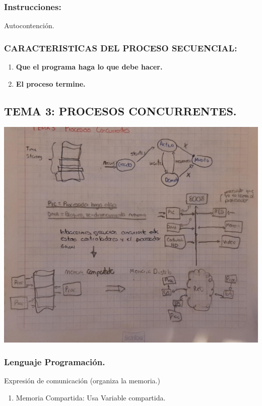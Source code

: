 \documentclass[12pt]{article}
\begin{document}
{\color{blue} \subsubsection*{\textbf{Instrucciones:}}}
Autocontención.
\\
{\color{blue} \subsubsection*{\textbf{CARACTERISTICAS DEL PROCESO SECUENCIAL:}}}
\begin{enumerate}
    \item \textbf{Que el programa haga lo que debe hacer.}
    \item \textbf{El proceso termine.}
\end{enumerate}


{\color{blue} \subsection*{\textbf{TEMA 3: PROCESOS CONCURRENTES.}}}
\vspace{1em}

\includegraphics[scale = 0.34]{images/esquema7.jpeg} \\

{\color{blue} \subsubsection*{\textbf{Lenguaje Programación.}}}
\vspace{1em}
Expresión de comunicación (organiza la memoria.)
\begin{enumerate}
    \item Memoria Compartida: Usa Variable compartida.
\end{enumerate}
\end{document}
